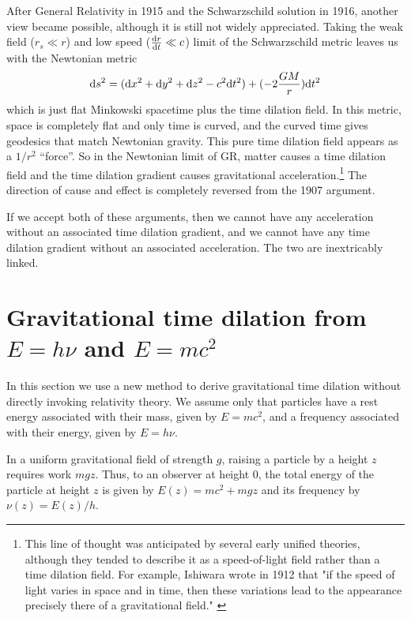After General Relativity in 1915 and the Schwarzschild solution in 1916,
another view became possible,
although it is still not widely appreciated.
Taking the weak field ($r_s \ll r$) and low speed ($\frac{{\rm d}r}{{\rm d}t} \ll c$) limit of the Schwarzschild metric
leaves us with the Newtonian metric
\begin{equation}
{\rm d}s^2 = ({\rm d}x^2 + {\rm d}y^2 +{\rm d}z^2 - c^2{\rm d}t^2) + (-2\frac{GM}{r}){\rm d}t^2
\end{equation}
which is just flat Minkowski spacetime plus the time dilation field.
In this metric, space is completely flat and only time is curved,
and the curved time gives geodesics that match Newtonian gravity.
This pure time dilation field appears as a $1/r^2$ ``force''.
So in the Newtonian limit of GR,
matter causes a time dilation field and the time dilation gradient causes gravitational acceleration.\footnote{This line of thought was anticipated by several early unified theories,
although they tended to describe it as a speed-of-light field rather than a time dilation field.
For example, Ishiwara wrote in 1912 that
"if the speed of light varies in space and in time,
then these variations lead to the appearance precisely there of a gravitational field." \cite{Ishiwara1912}}
The direction of cause and effect is completely reversed from the 1907 argument.

If we accept both of these arguments,
then we cannot have any acceleration without an associated time dilation gradient,
and we cannot have any time dilation gradient without an associated acceleration.
The two are inextricably linked.

\section{Gravitational time dilation from $E = h\nu$ and $E = mc^2$}
\label{sec:3}

In this section we use a new method
to derive gravitational time dilation without directly invoking relativity theory.
We assume only that particles have a rest energy associated with their mass, given by $E = mc^2$,
and a frequency associated with their energy, given by $E = h\nu$.

In a uniform gravitational field of strength $g$, raising a particle by a height $z$ requires work $mgz$. Thus, to an observer at height $0$, the total energy of the particle at height $z$ is given by $E(z) = mc^2 + mgz$ and its frequency by $\nu(z) = E(z)/h$.


